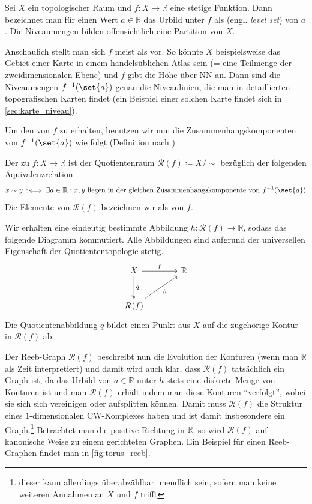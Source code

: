 Sei $X$ ein topologischer Raum und $f \colon X \to \mathbb{R}$ eine stetige Funktion.
Dann bezeichnet man für einen Wert $a \in \mathbb{R}$ das Urbild unter $f$ als  (engl. \emph{level set}) von $a$.
Die Niveaumengen bilden offensichtlich eine Partition von $X$.

Anschaulich stellt man sich $f$ meist als  vor.
So könnte $X$ beispielsweise das Gebiet einer Karte in einem handelsüblichen Atlas sein (= eine Teilmenge der zweidimensionalen Ebene) und $f$ gibt die Höhe über NN an.
Dann sind die Niveaumengen $f^{-1}(\set{a})$ genau die Niveaulinien, die man in detaillierten topografischen Karten findet (ein Beispiel einer solchen Karte findet sich in \cref{sec:karte_niveau}).

Um den  von $f$ zu erhalten, benutzen wir nun die Zusammenhangskomponenten von $f^{-1}(\set{a})$ wie folgt (Definition nach \textcite[.4]{compTopo})

\begin{definition}[{name=[Reeb-Graph]}]
	Der  zu $f \colon X \to \mathbb{R}$ ist der Quotientenraum $\mathcal{R}(f) \coloneqq X/{\sim}$ bezüglich der folgenden Äquivalenzrelation
	\[
		x \sim y \,:\mkern-3mu\iff \exists a \in \mathbb{R} : x,y \text{ liegen in der gleichen Zusammenhangskomponente von } f^{-1}(\set{a})
	\]
	Die Elemente von $\mathcal{R}(f)$ bezeichnen wir als  von $f$.
\end{definition}
Wir erhalten eine eindeutig bestimmte Abbildung $h \colon \mathcal{R}(f) \to \mathbb{R}$, sodass das folgende Diagramm kommutiert.
Alle Abbildungen sind aufgrund der universellen Eigenschaft der Quotiententopologie stetig.
\[
	\begin{tikzcd}[sep=large]
		X \rar["f"] \dar["q",two heads] & \mathbb{R} \\
		\mathcal{R}(f) \urar["h"']
	\end{tikzcd}
\]
Die Quotientenabbildung $q$ bildet einen Punkt aus $X$ auf die zugehörige Kontur in $\mathcal{R}(f)$ ab.

Der Reeb-Graph $\mathcal{R}(f)$ beschreibt nun die Evolution der Konturen (wenn man $\mathbb{R}$ als Zeit interpretiert) und damit wird auch klar, dass $\mathcal{R}(f)$ tatsächlich ein Graph ist, da das Urbild von $a \in \mathbb{R}$ unter $h$ stets eine diskrete Menge von Konturen ist und man $\mathcal{R}(f)$ erhält indem man diese Konturen \enquote{verfolgt}, wobei sie sich sich vereinigen oder aufsplitten können.
Damit muss $\mathcal{R}(f)$ die Struktur eines $1$-dimensionalen CW-Komplexes haben und ist damit insbesondere ein Graph.\footnote{dieser kann allerdings überabzählbar unendlich sein, sofern man keine weiteren Annahmen an $X$ und $f$ trifft}
Betrachtet man die positive Richtung in $\mathbb{R}$, so wird $\mathcal{R}(f)$ auf kanonische Weise zu einem gerichteten Graphen.
Ein Beispiel für einen Reeb-Graphen findet man in \cref{fig:torus_reeb}.

